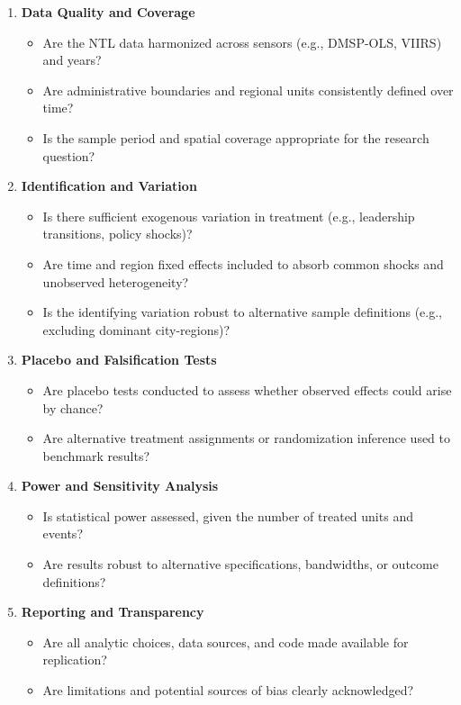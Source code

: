 \documentclass[12pt,a4paper]{article}
\begin{document}
\begin{enumerate}
	\item \textbf{Data Quality and Coverage}
	\begin{itemize}
		\item Are the NTL data harmonized across sensors (e.g., DMSP-OLS, VIIRS) and years?
		\item Are administrative boundaries and regional units consistently defined over time?
		\item Is the sample period and spatial coverage appropriate for the research question?
	\end{itemize}
	\item \textbf{Identification and Variation}
	\begin{itemize}
		\item Is there sufficient exogenous variation in treatment (e.g., leadership transitions, policy shocks)?
		\item Are time and region fixed effects included to absorb common shocks and unobserved heterogeneity?
		\item Is the identifying variation robust to alternative sample definitions (e.g., excluding dominant city-regions)?
	\end{itemize}
	\item \textbf{Placebo and Falsification Tests}
	\begin{itemize}
		\item Are placebo tests conducted to assess whether observed effects could arise by chance?
		\item Are alternative treatment assignments or randomization inference used to benchmark results?
	\end{itemize}
	\item \textbf{Power and Sensitivity Analysis}
	\begin{itemize}
		\item Is statistical power assessed, given the number of treated units and events?
		\item Are results robust to alternative specifications, bandwidths, or outcome definitions?
	\end{itemize}
	\item \textbf{Reporting and Transparency}
	\begin{itemize}
		\item Are all analytic choices, data sources, and code made available for replication?
		\item Are limitations and potential sources of bias clearly acknowledged?
	\end{itemize}
\end{enumerate}
\end{document}
